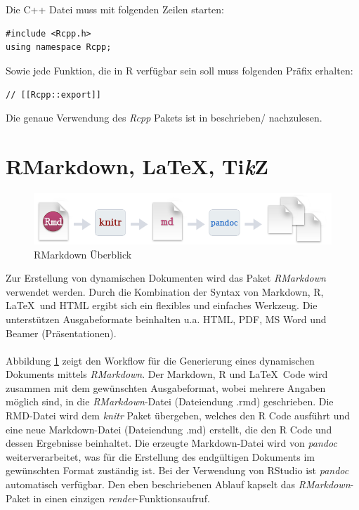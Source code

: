 \\
\\
Die C++ Datei muss mit folgenden Zeilen starten:
\lstset{language=C++, numbers=none, basicstyle=\ttfamily}
\begin{lstlisting}
#include <Rcpp.h>
using namespace Rcpp;
\end{lstlisting}
Sowie jede Funktion, die in R verfügbar sein soll muss folgenden Präfix erhalten:
\begin{lstlisting}
// [[Rcpp::export]]
\end{lstlisting}
Die genaue Verwendung des \emph{Rcpp} Pakets ist in \cite{wickham2015advanced} beschrieben/ nachzulesen.
\section{RMarkdown, \LaTeX, Ti\textit{k}Z}
\label{kapitel:rmarkdown}
\begin{figure}[!t]
\centering
\includegraphics[width=\ScaleIfNeeded]{abbildungen/rmarkdown}
\caption[RMarkdown Überblick, Quelle: \cite{rmarkdown}]{RMarkdown Überblick}
\label{abb:rmarkdown}
\end{figure}
Zur Erstellung von dynamischen Dokumenten wird das Paket \emph{RMarkdown} verwendet werden. Durch die Kombination der Syntax von Markdown, R, \LaTeX\ und HTML ergibt sich ein flexibles und einfaches Werkzeug. Die unterstützen Ausgabeformate beinhalten u.a. HTML, PDF, MS Word und Beamer (Präsentationen).
\\
\\
Abbildung \ref{abb:rmarkdown} zeigt den Workflow für die Generierung eines dynamischen Dokuments mittels \emph{RMarkdown}. Der Markdown, R und \LaTeX\ Code wird zusammen mit dem gewünschten Ausgabeformat, wobei mehrere Angaben möglich sind, in die \emph{RMarkdown}-Datei (Dateiendung .rmd) geschrieben. Die RMD-Datei wird dem \emph{knitr} Paket übergeben, welches den R Code ausführt und eine neue Markdown-Datei (Dateiendung .md) erstellt, die den R Code und dessen Ergebnisse beinhaltet. Die erzeugte Markdown-Datei wird von \emph{pandoc} weiterverarbeitet, was für die Erstellung des endgültigen Dokuments im gewünschten Format zuständig ist. Bei der Verwendung von RStudio ist \emph{pandoc} automatisch verfügbar. Den eben beschriebenen Ablauf kapselt das \emph{RMarkdown}-Paket in einen einzigen \emph{render}-Funktionsaufruf.
